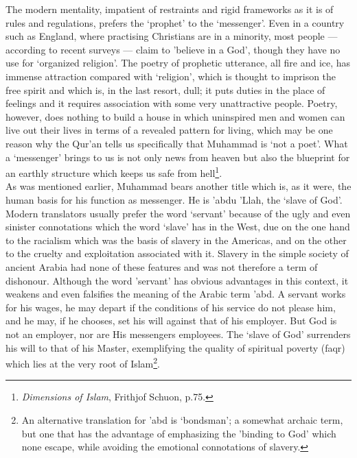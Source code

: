 \documentclass[10pt, twoside]{book}
\begin{document}
The modern mentality, impatient of restraints and rigid frameworks as it is of rules and regulations, 
prefers the `prophet' to the `messenger'. Even in a country such as England, where practising 
Christians are in a minority, most people --- according to recent surveys --- claim to 'believe in a 
God', though they have no use for `organized religion'. The poetry of prophetic utterance, all fire 
and ice, has immense attraction compared with `religion', which is thought to imprison the free 
spirit and which is, in the last resort, dull; it puts duties in the place of feelings and it 
requires association with some very unattractive people. Poetry, however, does nothing to build a 
house in which uninspired men and women can live out their lives in terms of a revealed pattern for 
living, which may be one reason why the Qur'an tells us specifically that Muhammad is `not a poet'. 
What a `messenger' brings to us is not only news from heaven but also the blueprint for an earthly 
structure which keeps us safe from hell\footnote{\emph{Dimensions of Islam}, Frithjof Schuon, p.75.}. \\

As was mentioned earlier, Muhammad bears another title which is, as it were, the human basis for his 
function as messenger. He is 'abdu 'Llah, the `slave of God'. Modern translators usually prefer the 
word `servant' because of the ugly and even sinister connotations which the word `slave' has in the 
West, due on the one hand to the racialism which was the basis of slavery in the Americas, and on the 
other to the cruelty and exploitation associated with it. Slavery in the simple society of ancient 
Arabia had none of these features and was not therefore a term of dishonour. Although the word 
'servant' has obvious advantages in this context, it weakens and even falsifies the meaning of the 
Arabic term 'abd. A servant works for his wages, he may depart if the conditions of his service do 
not please him, and he may, if he chooses, set his will against that of his employer. But God is not 
an employer, nor are His messengers employees. The `slave of God' surrenders his will to that of his 
Master, exemplifying the quality of spiritual poverty (faqr) which lies at the very root of Islam\footnote{An alternative translation for 'abd is `bondsman'; a somewhat archaic term, but one that has the 
advantage of emphasizing the 'binding to God' which none escape, while avoiding the emotional 
connotations of slavery.}. \\
\end{document}
